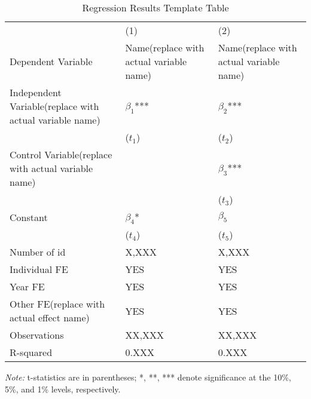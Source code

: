 \begin{table}[htbp]
    \caption{Regression Results Template Table}
    \label{Use the regression name as the label}
    \centering
    \begin{tabular}{p{5cm}p{3cm}p{3cm}} %
    \toprule
    & (1) & (2) \\
    Dependent Variable  & Name(replace with actual variable name)  & Name(replace with actual variable name) \\
    \midrule
    Independent Variable(replace with actual variable name)  & $\beta_1$*** & $\beta_2$*** \\ 
                & ($t_1$) & ($t_2$) \\
    Control Variable(replace with actual variable name)     &  & $\beta_3$*** \\  %
                &  & ($t_3$) \\
    Constant    & $\beta_4$* & $\beta_5$ \\
                & ($t_4$) & ($t_5$) \\
    
    Number of id       & X,XXX        & X,XXX \\
    Individual FE      & YES          & YES \\ %
    Year FE            & YES          & YES \\ %
    Other FE(replace with actual effect name)           & YES          & YES \\ %
    Observations       & XX,XXX       & XX,XXX \\
    R-squared          & 0.XXX        & 0.XXX \\
    \bottomrule
    \end{tabular}
    \begin{tablenotes}
    \small
    \item \textit{Note:} t-statistics are in parentheses; *, **, *** denote significance at the 10\%, 5\%, and 1\% levels, respectively.
    \end{tablenotes}
    \end{table}